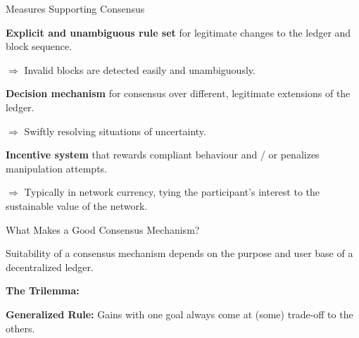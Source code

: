\documentclass[]{beamer}
\begin{document}
\begin{frame}{Measures Supporting Consensus}

\textbf{Explicit and unambiguous rule set} for legitimate changes to the ledger and block sequence.
\vspace{0.25 em}

$\Rightarrow$ Invalid blocks are detected easily and unambiguously.
\vspace{1.5 em}

\textbf{Decision mechanism} for consensus over different, legitimate extensions of the ledger. 
\vspace{0.25 em}

$\Rightarrow$ Swiftly resolving situations of uncertainty.
\vspace{1.5 em}

\textbf{Incentive system} that rewards compliant behaviour and / or penalizes manipulation attempts.
\vspace{0.25 em}

$\Rightarrow$ Typically in network currency, tying the participant's interest to the sustainable value of the network.

	
\end{frame}

\begin{frame}{What Makes a Good Consensus Mechanism?}

Suitability of a consensus mechanism \color{focus} depends on the purpose and user base \color {black} of a decentralized ledger.
\vspace{1 em}

\textbf{The Trilemma:}

\begin{center}
\begin{tikzpicture}[scale=0.6, every node/.style ={scale=0.8}]
		
\end{tikzpicture}
\end{center}

\textbf{Generalized Rule:} Gains with one goal always come at (some) trade-off to the others.
	
\end{frame}
\end{document}

